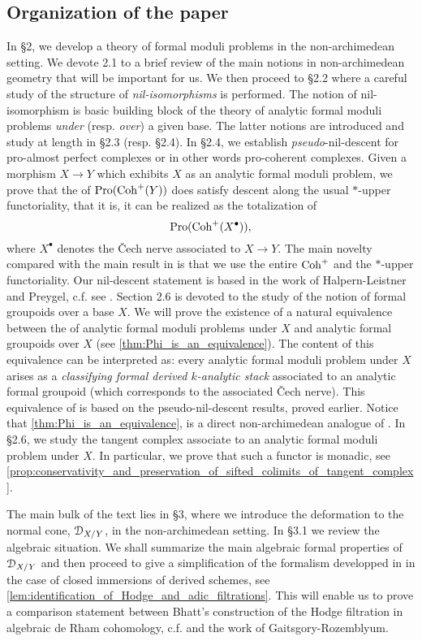 \documentclass[10pt,a4paper,reqno]{amsart} %
\theoremstyle{plain}
\theoremstyle{definition}
\theoremstyle{remark}
\numberwithin{equation}{section}
\begin{document}
\subsection{Organization of the paper}
In \S 2, we develop a theory of formal moduli problems in the non-archimedean setting. We devote 2.1 to a brief review of the main notions in non-archimedean
geometry that will be important for us. We then proceed to \S 2.2 where a careful study of the structure of \emph{nil-isomorphisms} is performed.
The notion of nil-isomorphism is basic building block of the theory of analytic formal moduli problems \emph{under} (resp. \emph{over}) a given base.
The latter notions are introduced and study at length in \S 2.3 (resp. \S 2.4). In \S 2.4, we establish \emph{pseudo}-nil-descent for pro-almost perfect complexes
or in other words pro-coherent complexes. Given a morphism $X \to Y$ which exhibits $X$ as an analytic formal moduli problem, we prove that
the \infcat of $\mathrm{Pro}(\mathrm{Coh}^+(Y))$ does satisfy descent along the usual $*$-upper functoriality, that it is, it can be realized as the totalization of
    \[\mathrm{Pro}(\mathrm{Coh}^+(X^\bullet)),\]
where $X^\bullet$ denotes the \v{C}ech nerve associated to $X \to Y$. The main novelty compared with the main result in \cite[\S 7.2]{Gaitsgory_Study_I}
is that we use the entire $\mathrm{Coh}^+$ and the $*$-upper functoriality. Our nil-descent statement is based in the work of Halpern-Leistner and Preygel, c.f.
see \cite[Theorem 3.3.1]{preygel_Leistner_Mapping_stacks_properness}. Section 2.6 is devoted to the study of the notion of formal groupoids over a base $X$.
We will prove the existence of a natural equivalence between the
\infcats of analytic formal moduli problems under $X$ and analytic formal groupoids over $X$ (see \cref{thm:Phi_is_an_equivalence}).
The content of this equivalence can be interpreted as: every analytic formal moduli problem under $X$ arises as a \emph{classifying formal derived $k$-analytic stack}
associated to an analytic formal groupoid (which corresponds to the associated \v{C}ech nerve).
This equivalence of \infcats is based on the pseudo-nil-descent results, proved earlier. Notice that \cref{thm:Phi_is_an_equivalence},
is a direct non-archimedean analogue
of \cite[\S 5, Theorem 2.3.2]{Gaitsgory_Study_II}. In \S 2.6, we study the tangent complex associate to an analytic formal moduli problem
under $X$. In particular, we prove that such a functor is monadic, see \cref{prop:conservativity_and_preservation_of_sifted_colimits_of_tangent_complex}.

The main bulk of the text lies in \S 3, where we introduce the deformation to the normal cone, $\mathcal D_{X/ Y}$, in the non-archimedean setting. In
\S 3.1 we review the algebraic situation. We shall summarize the main algebraic formal properties of $\mathcal D_{X/ Y}$ and then proceed to
give a simplification of the formalism developped in \cite[\S 9]{Gaitsgory_Study_II}
in the case of closed immersions of derived schemes, see \cref{lem:identification_of_Hodge_and_adic_filtrations}. This will enable us to prove a comparison statement between Bhatt's construction of the Hodge filtration in algebraic de Rham
cohomology, c.f. \cite{Bhatt_Derived_Completions} and the work of Gaitsgory-Rozemblyum.
\end{document}
